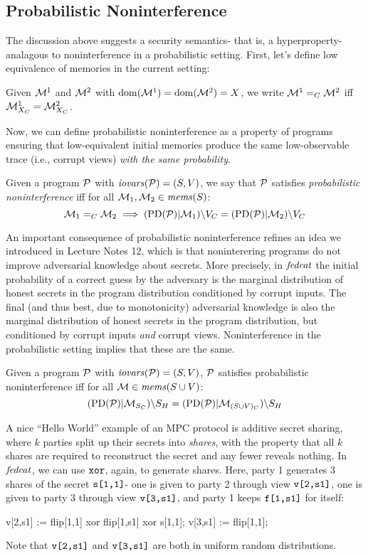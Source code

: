 \subsection{Probabilistic Noninterference} The discussion above suggests a
security semantics- that is, a hyperproperty- analagous to
noninterference in a probabilistic setting. First, let's
define low equivalence of memories in the current setting:
\begin{definition}
  Given $\mathcal{M}^1$ and $\mathcal{M}^2$ with $\mathrm{dom}(\mathcal{M}^1) = \mathrm{dom}(\mathcal{M}^2) = X$,
  we write $\mathcal{M}^1 =_C \mathcal{M}^2$ iff $\mathcal{M}^1_{X_C} = \mathcal{M}^2_{X_C}$.
\end{definition}
Now, we can define probabilistic noninterference as a property of
programs ensuring that low-equivalent initial memories produce
the same low-observable trace (i.e., corrupt views) \emph{with the
same probability}. 
\begin{definition}
  Given a program $\mathcal{P}$ with $\mathit{iovars}(\mathcal{P}) = (S,V)$, we say that
  $\mathcal{P}$ satisfies \emph{probabilistic noninterference} iff for all
  $\mathcal{M}_1, \mathcal{M}_2 \in \mathit{mems}(S)$:
  $$\mathcal{M}_1 =_C \mathcal{M}_2 \implies
    (\mathrm{PD}(\mathcal{P})|\mathcal{M}_1)\backslash V_C =
    (\mathrm{PD}(\mathcal{P})|\mathcal{M}_2)\backslash V_C$$
\end{definition}

An important consequence of probabilistic noninterference refines an
idea we introduced in Lecture Notes 12, which is that noninterering
programs do not improve adversarial knowledge about secrets.
More precisely, in $\mathit{fedcat}$ the initial probability of a correct
guess by the adversary is the marginal distribution of honest secrets
in the program distribution conditioned by corrupt inputs.
The final (and thus best, due to monotonicity) adversarial
knowledge is also the marginal distribution of honest secrets in the
program distribution, but conditioned by corrupt inputs \emph{and}
corrupt views. Noninterference in the probabilistic setting implies
that these are the same.
\begin{lemma}
  Given a program $\mathcal{P}$ with $\mathit{iovars}(\mathcal{P}) = (S,V)$, 
  $\mathcal{P}$ satisfies probabilistic noninterference iff for all
  $\mathcal{M} \in \mathit{mems}(S \cup V)$:
  $$(\mathrm{PD}(\mathcal{P})|\mathcal{M}_{S_C})\backslash S_H =
    (\mathrm{PD}(\mathcal{P})|\mathcal{M}_{(S\cup V)_C})\backslash S_H $$
\end{lemma}


 A nice ``Hello World''
example of an MPC protocol is additive secret sharing, where $k$
parties split up their secrets into \emph{shares}, with the property
that all $k$ shares are required to reconstruct the secret and any
fewer reveals nothing. In $\mathit{fedcat}$, we can use $\texttt{xor}$, again, to
generate shares. Here, party 1 generates 3 shares of the secret
$\texttt{s[1,1]}$- one is given to party 2 through view $\texttt{v[2,s1]}$, one is
given to party 3 through view $\texttt{v[3,s1]}$, and party 1 keeps
$\texttt{f[1,s1]}$ for itself:
\begin{verbatimtab}
v[2,s1] := flip[1,1] xor flip[1,s1] xor s[1,1];
v[3,s1] := flip[1,1];
\end{verbatimtab}
Note that $\texttt{v[2,s1]}$ and $\texttt{v[3,s1]}$ are both in uniform
random distributions.

